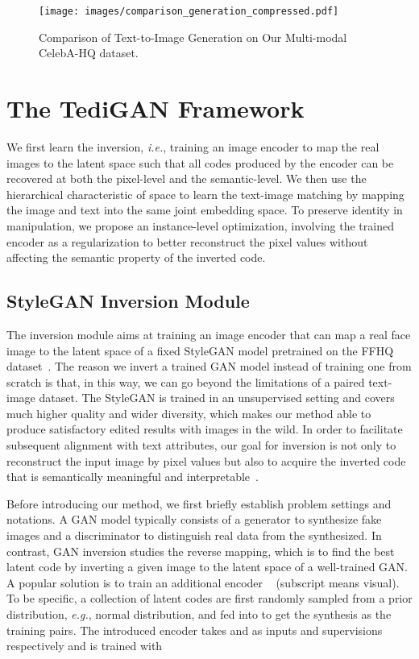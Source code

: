 \documentclass[final]{cvpr}
\def\eg{\emph{e.g.}}
\def\ie{\emph{i.e.}}
\begin{document}
\begin{figure*}[ht]
\centering
\texttt{[image: images/comparison\_generation\_compressed.pdf]}
\caption{Comparison of Text-to-Image Generation on Our Multi-modal CelebA-HQ dataset.}
\label{fig:comp_gen}
\end{figure*}

\section{The TediGAN Framework}
\label{sec:method}
We first learn the inversion, \ie, training an image encoder to map the real images to the latent space such that all codes produced by the encoder can be recovered at both the pixel-level and the semantic-level. 
We then use the hierarchical characteristic of  space to learn the text-image matching by mapping the image and text into the same joint embedding space.
To preserve identity in manipulation, we propose an instance-level optimization, involving the trained encoder as a regularization to better reconstruct the pixel values without affecting the semantic property of the inverted code. 

\subsection{StyleGAN Inversion Module}
\label{subsec:gan-inversion}
The inversion module aims at training an image encoder that can map a real face image to the latent space of a fixed StyleGAN model pretrained on the FFHQ dataset~\cite{karras2019style}.
The reason we invert a trained GAN model instead of training one from scratch is that, in this way, we can go beyond the limitations of a paired text-image dataset. 
The StyleGAN is trained in an unsupervised setting and covers much higher quality and wider diversity, which makes our method able to produce satisfactory edited results with images in the wild. 
In order to facilitate subsequent alignment with text attributes, our goal for inversion is not only to reconstruct the input image by pixel values but also to acquire the inverted code that is semantically meaningful and interpretable~\cite{shen2020interpreting,yang2019semantic}.

Before introducing our method, we first briefly establish problem settings and notations.
A GAN model typically consists of a generator  to synthesize fake images and a discriminator  to distinguish real data from the synthesized. 
In contrast, GAN inversion studies the reverse mapping, which is to find the best latent code  by inverting a given image  to the latent space of a well-trained GAN.
A popular solution is to train an additional encoder ~\cite{zhu2016generative,bau2019seeing} (subscript  means visual).
To be specific, a collection of latent codes  are first randomly sampled from a prior distribution, \eg, normal distribution, and fed into  to get the synthesis  as the training pairs.
The introduced encoder  takes  and  as inputs and supervisions respectively and is trained with
\end{document}
